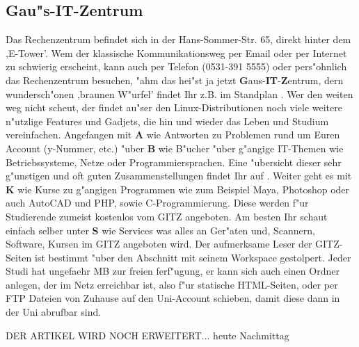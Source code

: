 \subsection{Gau"s-IT-Zentrum}

Das Rechenzentrum befindet sich in der Hans-Sommer-Str. 65, direkt hinter dem ,E-Tower'.
Wem der klassische Kommunikationsweg per Email  oder per Internet  zu schwierig erscheint, kann auch per Telefon (0531-391 5555) oder pers"ohnlich das Rechenzentrum besuchen, "ahm das hei"st ja jetzt \textbf{G}aus-\textbf{IT}-\textbf{Z}entrum, dern wundersch"onen ,braunen W"urfel' findet Ihr z.B. im Standplan . Wer den weiten weg nicht scheut, der findet au"ser den Linux-Distributionen noch viele weitere n"utzlige Features und Gadjets, die hin und wieder das Leben und Studium vereinfachen. Angefangen mit \textbf{A} wie Antworten zu Problemen rund um Euren Account (y-Nummer, etc.)
"uber \textbf{B} wie B"ucher "uber g"angige IT-Themen wie Betriebssysteme, Netze oder Programmiersprachen. Eine "ubersicht dieser sehr g"unstigen und oft guten Zusammenstellungen findet Ihr auf . Weiter geht es mit \textbf{K} wie Kurse  zu g"angigen Programmen wie zum Beispiel Maya, Photoshop oder auch AutoCAD und PHP, sowie C-Programmierung. Diese werden f"ur Studierende zumeist kostenlos vom GITZ angeboten. Am besten Ihr schaut einfach selber unter \textbf{S} wie Services  was alles an Ger"aten und, Scannern, Software, Kursen im GITZ angeboten wird.
Der aufmerksame Leser der GITZ-Seiten ist bestimmt "uber den Abschnitt mit seinem Workspace gestolpert. Jeder Studi hat ungefaehr \unit[250]{MB} zur freien ferf"ugung, er kann sich auch einen Ordner anlegen, der im Netz erreichbar ist, also f"ur statische HTML-Seiten, oder per FTP Dateien von Zuhause auf den Uni-Account schieben, damit diese dann in der Uni abrufbar sind.\newline

DER ARTIKEL WIRD NOCH ERWEITERT... heute Nachmittag
